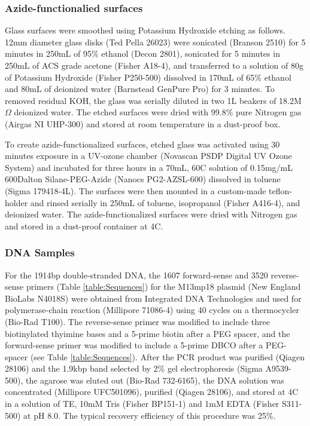 \documentclass[%
  aip,12pt,tightenlines,
  amsthm,
 amsmath,amssymb
]{article}
\newcommand{\tRef}[1]{Table \ref{table:#1}}
\newcommand{\sLabel}[1]{\label{section:#1}}
\newcommand{\firstp}[0]{}
\newcommand{\pl}[0]{\vspace{6pt}}
\newcommand{\supply}[2]{(#1 #2)}
\newcommand{\degreeC}[0]{\degree{}C}
\begin{document}
\subsubsection{\sLabel{Surface}Azide-functionalied surfaces}

\firstp Glass surfaces were smoothed using Potassium Hydroxide etching as follows. 12mm diameter glass disks \supply{Ted Pella}{26023} were sonicated \supply{Branson}{2510} for 5 minutes in 250mL of 95\% ethanol \supply{Decon}{2801}, sonicated  for 5 minutes in 250mL of ACS grade acetone \supply{Fisher}{A18-4}, and transferred to a solution of 80g of Potassium Hydroxide \supply{Fisher}{P250-500} dissolved in  170mL of 65\% ethanol and 80mL of deionized water \supply{Barnstead}{GenPure Pro} for 3 minutes. To removed residual KOH, the glass was serially diluted in two 1L beakers of 18.2M$\Omega$ deionized water. The etched surfaces were dried with 99.8\% pure Nitrogen gas \supply{Airgas}{NI UHP-300} and stored at room temperature in a dust-proof box. \pl

To create azide-functionalized surfaces, etched glass was activated using 30 minutes exposure in a UV-ozone chamber \supply{Novascan}{PSDP Digital UV Ozone System} and incubated for three hours in a 70mL, 60\degreeC{} solution of 0.15mg/mL 600Dalton Silane-PEG-Azide \supply{Nanocs}{PG2-AZSL-600} dissolved in toluene \supply{Sigma}{179418-4L}. The surfaces were then mounted in a custom-made teflon-holder and rinsed serially in 250mL of toluene, isopropanol \supply{Fisher}{A416-4}, and deionized water. The azide-functionalized surfaces were dried with Nitrogen gas and stored in a dust-proof container at 4\degreeC{}. \pl 

\subsubsection{\sLabel{Sample}DNA Samples}

\firstp For the 1914bp double-stranded DNA, the 1607 forward-sense and 3520 reverse-sense primers (\tRef{Sequences}) for the M13mp18 plasmid \supply{New England BioLabs}{N4018S} were obtained from Integrated DNA Technologies  and used for polymerase-chain reaction \supply{Millipore}{71086-4} using 40 cycles on a thermocycler \supply{Bio-Rad}{T100}. The reverse-sense primer was modified to include three biotinylated thyimine bases and a 5-prime biotin after a PEG spacer, and the forward-sense primer was modified to include a 5-prime DBCO after a PEG-spacer (see \tRef{Sequences}). After the PCR product was purified \supply{Qiagen}{28106} and the 1.9kbp band selected by 2\% gel electrophoresis \supply{Sigma}{A9539-500}, the agarose was eluted out \supply{Bio-Rad}{732-6165}, the DNA solution was concentrated \supply{Millipore}{UFC501096}, purified \supply{Qiagen}{28106}, and stored at 4\degreeC{} in a solution of TE, 10mM Tris \supply{Fisher}{BP151-1} and 1mM EDTA \supply{Fisher}{S311-500} at pH 8.0. The typical recovery efficiency of this procedure was 25\%. \pl
\end{document}
